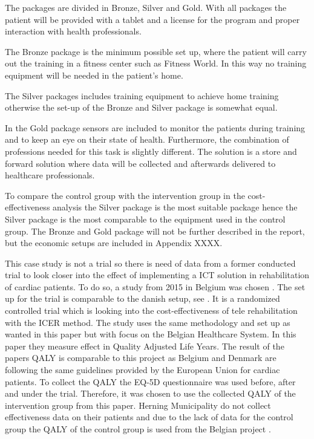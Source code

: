 The packages are divided in Bronze, Silver and Gold. With all packages the patient will be provided with a tablet and a license for the program and proper interaction with health professionals. 

The Bronze package is the minimum possible set up, where the patient will carry out the training in a fitness center such as Fitness World. In this way no training equipment will be needed in the patient’s home. 

The Silver packages includes training equipment to achieve home training otherwise the set-up of the Bronze and Silver package is somewhat equal. 

In the Gold package sensors are included to monitor the patients during training and to keep an eye on their state of health. Furthermore, the combination of professions needed for this task is slightly different. The solution is a store and forward solution where data will be collected and afterwards delivered to healthcare professionals.  

To compare the control group with the intervention group in the cost-effectiveness analysis the Silver package is the most suitable package hence the Silver package is the most comparable to the equipment used in the control group. The Bronze and Gold package will not be further described in the report, but the economic setups are included in Appendix XXXX.

This case study is not a trial so there is need of data from a former conducted trial to look closer into the effect of implementing a ICT solution in rehabilitation of cardiac patients. To do so, a study from 2015 in Belgium was chosen \cite{costeffect}. The set up for the trial is comparable to the danish setup, see . It is a randomized controlled trial which is looking into the cost-effectiveness of tele rehabilitation with the ICER method. The study uses the same methodology and set up as wanted in this paper but with focus on the Belgian Healthcare System. In this paper they measure effect in Quality Adjusted Life Years. The result of the papers QALY is comparable to this project as Belgium and Denmark are following the same guidelines provided by the European Union for cardiac patients. To collect the QALY the EQ-5D questionnaire was used before, after and under the trial. Therefore, it was chosen to use the collected QALY of the intervention group from this paper. Herning Municipality do not collect effectiveness data on their patients and due to the lack of data for the control group the QALY of the control group is used from the Belgian project \cite{costeffect}.

